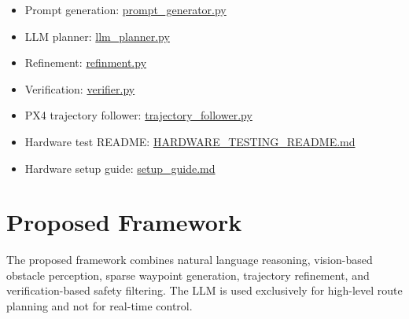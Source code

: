 \documentclass[11pt]{article}
\begin{document}
\begin{itemize}
  \item Prompt generation: \href{https://github.com/prachitgupta/starling_testing_ws/blob/main/src/llm_vision_planner/scripts/prompt_generator.py}{prompt\_generator.py}
  \item LLM planner: \href{https://github.com/prachitgupta/starling_testing_ws/blob/main/src/llm_vision_planner/scripts/llm_planner.py}{llm\_planner.py}
  \item Refinement: \href{https://github.com/prachitgupta/starling_testing_ws/blob/main/src/llm_vision_planner/scripts/refinment.py}{refinment.py}
  \item Verification: \href{https://github.com/prachitgupta/starling_testing_ws/blob/main/src/llm_vision_planner/scripts/verifier.py}{verifier.py}
  \item PX4 trajectory follower: \href{https://github.com/prachitgupta/starling_testing_ws/blob/main/src/llm_vision_planner/scripts/trajectory_follower.py}{trajectory\_follower.py}
  \item Hardware test README: \href{https://github.com/prachitgupta/starling_testing_ws/blob/main/src/llm_vision_planner/HARDWARE_TESTING_README.md}{HARDWARE\_TESTING\_README.md}
  \item Hardware setup guide: \href{https://github.com/prachitgupta/starling_testing_ws/blob/main/setup_guide.md}{setup\_guide.md}
\end{itemize}

\section{Proposed Framework}

The proposed framework combines natural language reasoning, vision-based obstacle perception, sparse waypoint generation, trajectory refinement, and verification-based safety filtering. The LLM is used exclusively for high-level route planning and not for real-time control.
\end{document}
